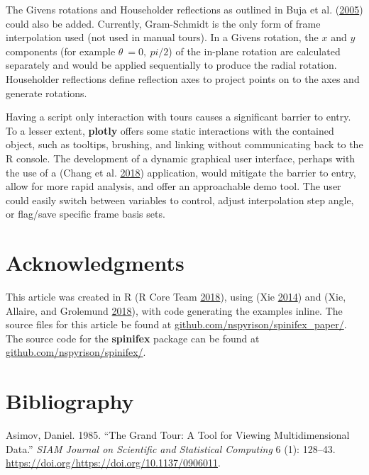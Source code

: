 The Givens rotations and Householder reflections as outlined in Buja et
al. (\protect\hyperlink{ref-buja_computational_2005}{2005}) could also
be added. Currently, Gram-Schmidt is the only form of frame
interpolation used (not used in manual tours). In a Givens rotation, the
\(x\) and \(y\) components (for example \(\theta~= 0,~pi/2\)) of the
in-plane rotation are calculated separately and would be applied
sequentially to produce the radial rotation. Householder reflections
define reflection axes to project points on to the axes and generate
rotations.

Having a script only interaction with tours causes a significant barrier
to entry. To a lesser extent, \textbf{plotly} offers some static
interactions with the contained object, such as tooltips, brushing, and
linking without communicating back to the R console. The development of
a dynamic graphical user interface, perhaps with the use of a
 (Chang et al.
\protect\hyperlink{ref-chang_shiny:_2018}{2018}) application, would
mitigate the barrier to entry, allow for more rapid analysis, and offer
an approachable demo tool. The user could easily switch between
variables to control, adjust interpolation step angle, or flag/save
specific frame basis sets.

\hypertarget{acknowledgments}{%
\section{Acknowledgments}\label{acknowledgments}}

This article was created in R (R Core Team
\protect\hyperlink{ref-r_core_team_r:_2018}{2018}), using
 (Xie \protect\hyperlink{ref-stodden_knitr:_2014}{2014})
and  (Xie, Allaire, and Grolemund
\protect\hyperlink{ref-xie_r_2018}{2018}), with code generating the
examples inline. The source files for this article be found at
\href{https://github.com/nspyrison/spinifex_paper/}{github.com/nspyrison/spinifex\_paper/}.
The source code for the \textbf{spinifex} package can be found at
\href{https://github.com/nspyrison/spinifex/}{github.com/nspyrison/spinifex/}.

\hypertarget{bibliography}{%
\section*{Bibliography}\label{bibliography}}

\hypertarget{refs}{}
\leavevmode\hypertarget{ref-asimov_grand_1985}{}%
Asimov, Daniel. 1985. ``The Grand Tour: A Tool for Viewing
Multidimensional Data.'' \emph{SIAM Journal on Scientific and
Statistical Computing} 6 (1): 128--43.
\url{https://doi.org/https://doi.org/10.1137/0906011}.

